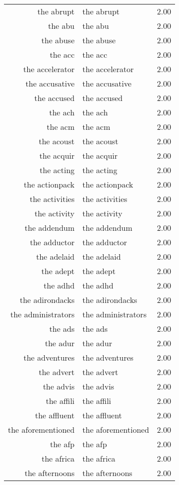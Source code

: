 \begin{table}[ht]
\begin{tabular}{rlr}
  the abrupt & the abrupt & 2.00 \\ 
  the abu & the abu & 2.00 \\ 
  the abuse & the abuse & 2.00 \\ 
  the acc & the acc & 2.00 \\ 
  the accelerator & the accelerator & 2.00 \\ 
  the accusative & the accusative & 2.00 \\ 
  the accused & the accused & 2.00 \\ 
  the ach & the ach & 2.00 \\ 
  the acm & the acm & 2.00 \\ 
  the acoust & the acoust & 2.00 \\ 
  the acquir & the acquir & 2.00 \\ 
  the acting & the acting & 2.00 \\ 
  the actionpack & the actionpack & 2.00 \\ 
  the activities & the activities & 2.00 \\ 
  the activity & the activity & 2.00 \\ 
  the addendum & the addendum & 2.00 \\ 
  the adductor & the adductor & 2.00 \\ 
  the adelaid & the adelaid & 2.00 \\ 
  the adept & the adept & 2.00 \\ 
  the adhd & the adhd & 2.00 \\ 
  the adirondacks & the adirondacks & 2.00 \\ 
  the administrators & the administrators & 2.00 \\ 
  the ads & the ads & 2.00 \\ 
  the adur & the adur & 2.00 \\ 
  the adventures & the adventures & 2.00 \\ 
  the advert & the advert & 2.00 \\ 
  the advis & the advis & 2.00 \\ 
  the affili & the affili & 2.00 \\ 
  the affluent & the affluent & 2.00 \\ 
  the aforementioned & the aforementioned & 2.00 \\ 
  the afp & the afp & 2.00 \\ 
  the africa & the africa & 2.00 \\ 
  the afternoons & the afternoons & 2.00 \\ 

\end{tabular}
\end{table}
